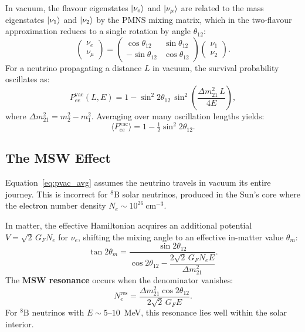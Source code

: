 \documentclass[12pt, a4paper]{article}
\begin{document}
In vacuum, the flavour eigenstates $\ket{\nu_e}$ and $\ket{\nu_\mu}$ are
related to the mass eigenstates $\ket{\nu_1}$ and $\ket{\nu_2}$ by the
PMNS mixing matrix, which in the two-flavour approximation reduces to a
single rotation by angle $\theta_{12}$:
\begin{equation}
    \begin{pmatrix} \nu_e \\ \nu_\mu \end{pmatrix}
    =
    \begin{pmatrix}
        \cos\theta_{12} & \sin\theta_{12} \\
       -\sin\theta_{12} & \cos\theta_{12}
    \end{pmatrix}
    \begin{pmatrix} \nu_1 \\ \nu_2 \end{pmatrix}.
    \label{eq:mixing}
\end{equation}
For a neutrino propagating a distance $L$ in vacuum, the survival probability
oscillates as:
\begin{equation}
    P_{ee}^{\text{vac}}(L,E)
    = 1 - \sin^2 2\theta_{12}\,
      \sin^2\!\left(\frac{\Delta m^2_{21}\, L}{4E}\right),
    \label{eq:pvac}
\end{equation}
where $\Delta m^2_{21} = m_2^2 - m_1^2$.
Averaging over many oscillation lengths yields:
\begin{equation}
    \langle P_{ee}^{\text{vac}} \rangle
    = 1 - \tfrac{1}{2}\sin^2 2\theta_{12}.
    \label{eq:pvac_avg}
\end{equation}
 
\subsection{The MSW Effect}
\label{sec:msw}
 
Equation~\eqref{eq:pvac_avg} assumes the neutrino travels in vacuum its
entire journey.
This is incorrect for ${}^8\text{B}$ solar neutrinos, produced in the
Sun's core where the electron number density $N_e \sim 10^{26}\ \text{cm}^{-3}$.
 
In matter, the effective Hamiltonian acquires an additional potential
$V = \sqrt{2}\,G_F N_e$ for $\nu_e$, shifting the mixing angle to an
effective in-matter value $\theta_m$:
\begin{equation}
    \tan 2\theta_m
    = \frac{\sin 2\theta_{12}}
           {\cos 2\theta_{12}
            - \dfrac{2\sqrt{2}\,G_F N_e E}{\Delta m^2_{21}}}.
    \label{eq:msw_angle}
\end{equation}
The \textbf{MSW resonance} occurs when the denominator vanishes:
\begin{equation}
    N_e^{\text{res}}
    = \frac{\Delta m^2_{21}\cos 2\theta_{12}}{2\sqrt{2}\,G_F E}.
    \label{eq:resonance}
\end{equation}
For ${}^8\text{B}$ neutrinos with $E \sim 5$--$10$~MeV, this resonance
lies well within the solar interior.
 
\end{document}
